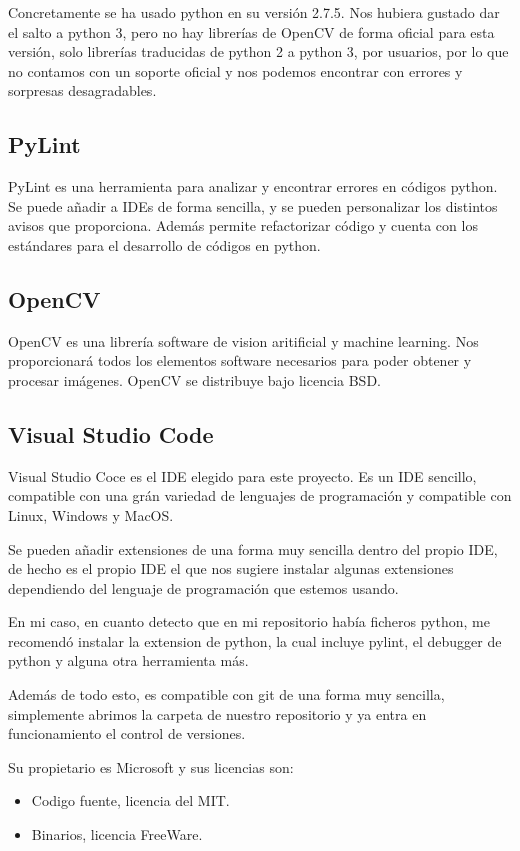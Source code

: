 Concretamente se ha usado python en su versión 2.7.5.
Nos hubiera gustado dar el salto a python 3, pero no hay librerías de OpenCV de forma oficial para esta versión, solo librerías traducidas de python 2 a python 3, por usuarios, por lo que no contamos con un soporte oficial y nos podemos encontrar con errores y sorpresas desagradables.


\subsection{PyLint}
PyLint es una herramienta para analizar y encontrar errores en códigos python. Se puede añadir a IDEs de forma sencilla, y se pueden personalizar los distintos avisos que proporciona. 
Además permite refactorizar código y cuenta con los estándares para el desarrollo de códigos en python.

\subsection{OpenCV}
OpenCV es una librería software de vision aritificial y machine learning. Nos proporcionará todos los elementos software necesarios para poder obtener y procesar imágenes. 
OpenCV se distribuye bajo licencia BSD.

\subsection{Visual Studio Code}
Visual Studio Coce es el IDE elegido para este proyecto. Es un IDE sencillo, compatible con una grán variedad de lenguajes de programación y compatible con Linux, Windows y MacOS.
 
Se pueden añadir extensiones de una forma muy sencilla dentro del propio IDE, de hecho es el propio IDE el que nos sugiere instalar algunas extensiones dependiendo del lenguaje de programación que estemos usando. 

En mi caso, en cuanto detecto que en mi repositorio había ficheros python, me recomendó instalar la extension de python, la cual incluye pylint, el debugger de python y alguna otra herramienta más.

Además de todo esto, es compatible con git de una forma muy sencilla, simplemente abrimos la carpeta de nuestro repositorio y ya entra en funcionamiento el control de versiones.

Su propietario es Microsoft y sus licencias son:
\begin{itemize}
	\item Codigo fuente, licencia del MIT.
	\item Binarios, licencia FreeWare.
\end{itemize}




 
